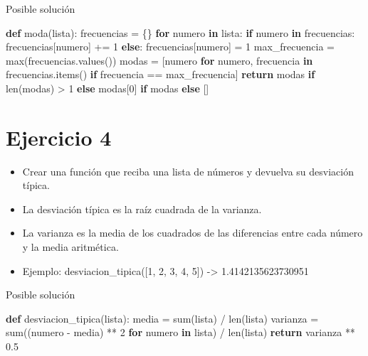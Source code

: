\documentclass[
  a4paper,
  DIV=11,
  numbers=noendperiod,
  onepage,
  openany]{scrreprt}
\newenvironment{Shaded}{\begin{snugshade}}{\end{snugshade}}
\newcommand{\BuiltInTok}[1]{\textcolor[rgb]{0.00,0.23,0.31}{#1}}
\newcommand{\ControlFlowTok}[1]{\textcolor[rgb]{0.00,0.23,0.31}{\textbf{#1}}}
\newcommand{\DecValTok}[1]{\textcolor[rgb]{0.68,0.00,0.00}{#1}}
\newcommand{\FloatTok}[1]{\textcolor[rgb]{0.68,0.00,0.00}{#1}}
\newcommand{\KeywordTok}[1]{\textcolor[rgb]{0.00,0.23,0.31}{\textbf{#1}}}
\newcommand{\NormalTok}[1]{\textcolor[rgb]{0.00,0.23,0.31}{#1}}
\newcommand{\OperatorTok}[1]{\textcolor[rgb]{0.37,0.37,0.37}{#1}}
\providecommand{\tightlist}{%
  \setlength{\itemsep}{0pt}\setlength{\parskip}{0pt}}\usepackage{longtable,booktabs,array}
\begin{document}
\begin{tcolorbox}
Posible solución

\begin{Shaded}
\begin{Highlighting}[]
\KeywordTok{def}\NormalTok{ moda(lista):}
\NormalTok{    frecuencias }\OperatorTok{=}\NormalTok{ \{\}}
    \ControlFlowTok{for}\NormalTok{ numero }\KeywordTok{in}\NormalTok{ lista:}
        \ControlFlowTok{if}\NormalTok{ numero }\KeywordTok{in}\NormalTok{ frecuencias:}
\NormalTok{            frecuencias[numero] }\OperatorTok{+=} \DecValTok{1}
        \ControlFlowTok{else}\NormalTok{:}
\NormalTok{            frecuencias[numero] }\OperatorTok{=} \DecValTok{1}
\NormalTok{    max\_frecuencia }\OperatorTok{=} \BuiltInTok{max}\NormalTok{(frecuencias.values())}
\NormalTok{    modas }\OperatorTok{=}\NormalTok{ [numero }\ControlFlowTok{for}\NormalTok{ numero, frecuencia }\KeywordTok{in}\NormalTok{ frecuencias.items() }\ControlFlowTok{if}\NormalTok{ frecuencia }\OperatorTok{==}\NormalTok{ max\_frecuencia]}
    \ControlFlowTok{return}\NormalTok{ modas }\ControlFlowTok{if} \BuiltInTok{len}\NormalTok{(modas) }\OperatorTok{\textgreater{}} \DecValTok{1} \ControlFlowTok{else}\NormalTok{ modas[}\DecValTok{0}\NormalTok{] }\ControlFlowTok{if}\NormalTok{ modas }\ControlFlowTok{else}\NormalTok{ []}
\end{Highlighting}
\end{Shaded}

\section{Ejercicio 4}\label{ejercicio-4-2}

\begin{itemize}
\tightlist
\item
  Crear una función que reciba una lista de números y devuelva su
  desviación típica.
\item
  La desviación típica es la raíz cuadrada de la varianza.
\item
  La varianza es la media de los cuadrados de las diferencias entre cada
  número y la media aritmética.
\item
  Ejemplo: desviacion\_tipica({[}1, 2, 3, 4, 5{]}) -\textgreater{}
  1.4142135623730951
\end{itemize}

Posible solución

\begin{Shaded}
\begin{Highlighting}[]
\KeywordTok{def}\NormalTok{ desviacion\_tipica(lista):}
\NormalTok{    media }\OperatorTok{=} \BuiltInTok{sum}\NormalTok{(lista) }\OperatorTok{/} \BuiltInTok{len}\NormalTok{(lista)}
\NormalTok{    varianza }\OperatorTok{=} \BuiltInTok{sum}\NormalTok{((numero }\OperatorTok{{-}}\NormalTok{ media) }\OperatorTok{**} \DecValTok{2} \ControlFlowTok{for}\NormalTok{ numero }\KeywordTok{in}\NormalTok{ lista) }\OperatorTok{/} \BuiltInTok{len}\NormalTok{(lista)}
    \ControlFlowTok{return}\NormalTok{ varianza }\OperatorTok{**} \FloatTok{0.5}
\end{Highlighting}
\end{Shaded}


\end{tcolorbox}
\end{document}
